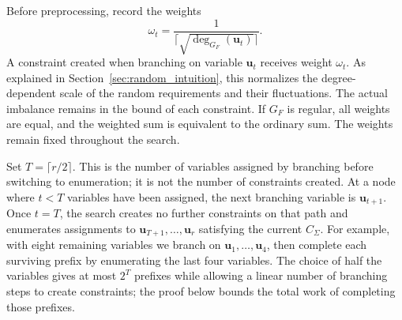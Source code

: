 \documentclass[11pt,a4paper]{article}
\theoremstyle{definition}
\theoremstyle{remark}
\begin{document}
Before preprocessing, record the weights
\begin{equation}
 \omega_t=\frac{1}{\lceil\sqrt{\deg_{G_F}(\mathbf u_t)}\rceil}.
 \label{eq:random_weights}
\end{equation}
A constraint created when branching on variable $\mathbf u_t$ receives weight
$\omega_t$. As explained in Section~\ref{sec:random_intuition}, this
normalizes the degree-dependent scale of the random requirements and
their fluctuations. The actual imbalance remains in the bound of each
constraint. If $G_F$ is regular, all weights are equal,
and the weighted sum is equivalent to the ordinary sum.
The weights remain fixed throughout the search.

Set $T=\lceil r/2\rceil$. This is the number of variables assigned by
branching before switching to enumeration; it is not the number of
constraints created. At a node where $t<T$ variables have been assigned,
the next branching variable is $\mathbf u_{t+1}$. Once $t=T$, the search
creates no further constraints on that path and enumerates assignments
to $\mathbf u_{T+1},\ldots,\mathbf u_r$ satisfying the current $C_\Sigma$.
For example, with eight remaining variables we branch on $\mathbf u_1,\ldots,\mathbf u_4$,
then complete each surviving prefix by enumerating the last four variables.
The choice of half the variables gives at most $2^T$ prefixes while
allowing a linear number of branching steps to create constraints; the
proof below bounds the total work of completing those prefixes.
\end{document}
